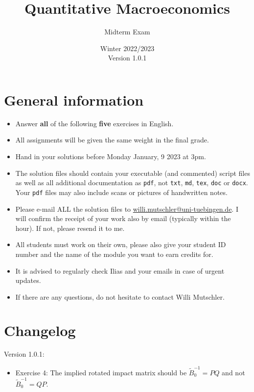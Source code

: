 \documentclass{article}
\begin{document}
	
\title{Quantitative Macroeconomics}
\author{Midterm Exam}
\date{Winter 2022/2023\\Version 1.0.1}
\maketitle

\section*{General information}
\begin{itemize}
	\item Answer \textbf{all} of the following \textbf{five} exercises in English.
	\item All assignments will be given the same weight in the final grade.
	\item Hand in your solutions before Monday January, 9 2023 at 3pm.
	\item The solution files should contain your executable (and commented) script files
		as well as all additional documentation as \texttt{pdf}, not \texttt{txt}, \texttt{md}, \texttt{tex}, \texttt{doc} or \texttt{docx}.
	Your \texttt{pdf} files may also include scans or pictures of handwritten notes.
	\item Please e-mail ALL the solution files to \url{willi.mutschler@uni-tuebingen.de}.
	I will confirm the receipt of your work also by email (typically within the hour). If not, please resend it to me.
	\item All students must work on their own, please also give your student ID number and the name of the module you want to earn credits for.
	\item It is advised to regularly check Ilias and your emails in case of urgent updates.
	\item If there are any questions, do not hesitate to contact Willi Mutschler.
\end{itemize}

\section*{Changelog}
Version 1.0.1:
\begin{itemize}
	\item Exercise 4: The implied rotated impact matrix should be $\widetilde{B}_0^{-1}=PQ$ and not $\widetilde{B}_0^{-1}=QP$.
\end{itemize}

\newpage
\end{document}
